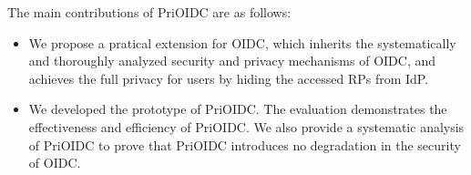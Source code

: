 
The main contributions of PriOIDC are as follows:
\begin{itemize}
\item We propose a pratical extension for OIDC, which inherits the systematically and thoroughly analyzed  security and privacy mechanisms of OIDC, and achieves the full privacy for users by hiding the accessed RPs from IdP.
\item We developed the prototype of PriOIDC. The evaluation demonstrates the effectiveness and efficiency of PriOIDC. We also provide a systematic analysis of PriOIDC to prove that PriOIDC introduces no degradation  in the security of OIDC.
\end{itemize}



